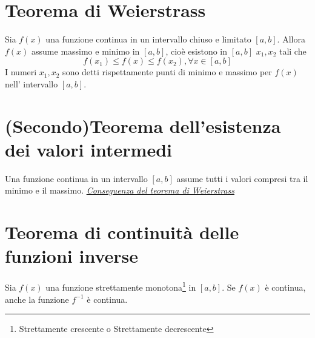 \documentclass{article}
\begin{document}
\section{Teorema di Weierstrass}
Sia $f(x)$ una funzione continua in un intervallo chiuso e limitato $[a,b]$.
Allora $f(x)$ assume massimo e minimo in $[a,b]$, cioè esistono in $[a,b]$
$x_1,x_2$ tali che $$f(x_1) \leq f(x) \leq f(x_2), \forall x \in [a,b]$$ I
numeri $x_1, x_2$ sono detti rispettamente punti di minimo e massimo per $f(x)$
nell' intervallo $[a,b]$.
\section{(Secondo)Teorema dell'esistenza dei valori intermedi}
Una funzione continua in un intervallo $[a,b]$ assume tutti i valori compresi
tra il minimo e il massimo. \underline{\textit {Conseguenza del teorema di
        Weierstrass}}
\section{Teorema di continuità delle funzioni inverse}
Sia $f(x)$ una funzione strettamente monotona\footnote{Strettamente crescente o
    Strettamente decrescente} in $[a,b]$. Se $f(x)$ è continua, anche la funzione
$f^{-1}$ è continua.
\end{document}
